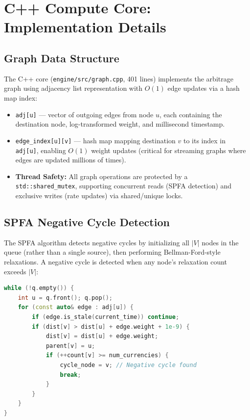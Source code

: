 \documentclass[letterpaper,11pt]{report}
\begin{document}
\chapter{C++ Compute Core: Implementation Details}

\section{Graph Data Structure}

The C++ core (\texttt{engine/src/graph.cpp}, 401 lines) implements the arbitrage graph using adjacency list representation with $O(1)$ edge updates via a hash map index:

\begin{itemize}
    \item \texttt{adj[u]} --- vector of outgoing edges from node $u$, each containing the destination node, log-transformed weight, and millisecond timestamp.
    \item \texttt{edge\_index[u][v]} --- hash map mapping destination $v$ to its index in \texttt{adj[u]}, enabling $O(1)$ weight updates (critical for streaming graphs where edges are updated millions of times).
    \item \textbf{Thread Safety:} All graph operations are protected by a \texttt{std::shared\_mutex}, supporting concurrent reads (SPFA detection) and exclusive writes (rate updates) via shared/unique locks.
\end{itemize}

\section{SPFA Negative Cycle Detection}

The SPFA algorithm detects negative cycles by initializing all $|V|$ nodes in the queue (rather than a single source), then performing Bellman-Ford-style relaxations. A negative cycle is detected when any node's relaxation count exceeds $|V|$:

\begin{lstlisting}[language=C++, caption={SPFA core loop (simplified)}, label=lst:spfa]
while (!q.empty()) {
    int u = q.front(); q.pop();
    for (const auto& edge : adj[u]) {
        if (edge.is_stale(current_time)) continue;
        if (dist[v] > dist[u] + edge.weight + 1e-9) {
            dist[v] = dist[u] + edge.weight;
            parent[v] = u;
            if (++count[v] >= num_currencies) {
                cycle_node = v; // Negative cycle found
                break;
            }
        }
    }
}
\end{lstlisting}
\end{document}
